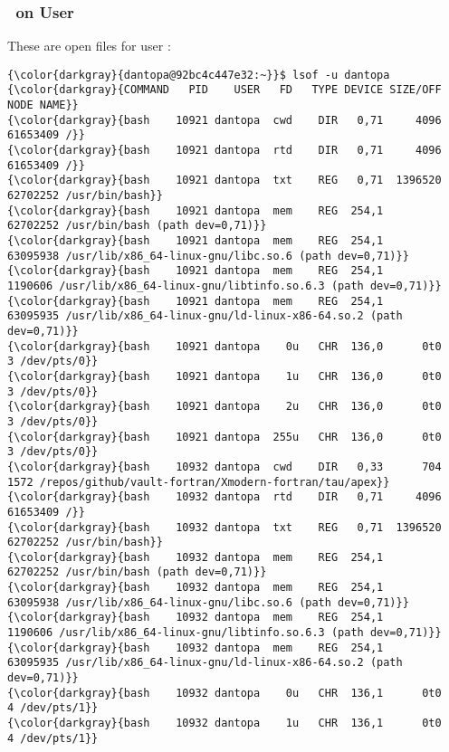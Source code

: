 {		\subsubsection{\lsof \ on User}
These are open files for user :
{\footnotesize{
\begin{Verbatim}[commandchars=\\\{\}]
{\color{darkgray}{dantopa@92bc4c447e32:~}}$ lsof -u dantopa
{\color{darkgray}{COMMAND   PID    USER   FD   TYPE DEVICE SIZE/OFF     NODE NAME}}
{\color{darkgray}{bash    10921 dantopa  cwd    DIR   0,71     4096 61653409 /}}
{\color{darkgray}{bash    10921 dantopa  rtd    DIR   0,71     4096 61653409 /}}
{\color{darkgray}{bash    10921 dantopa  txt    REG   0,71  1396520 62702252 /usr/bin/bash}}
{\color{darkgray}{bash    10921 dantopa  mem    REG  254,1          62702252 /usr/bin/bash (path dev=0,71)}}
{\color{darkgray}{bash    10921 dantopa  mem    REG  254,1          63095938 /usr/lib/x86_64-linux-gnu/libc.so.6 (path dev=0,71)}}
{\color{darkgray}{bash    10921 dantopa  mem    REG  254,1           1190606 /usr/lib/x86_64-linux-gnu/libtinfo.so.6.3 (path dev=0,71)}}
{\color{darkgray}{bash    10921 dantopa  mem    REG  254,1          63095935 /usr/lib/x86_64-linux-gnu/ld-linux-x86-64.so.2 (path dev=0,71)}}
{\color{darkgray}{bash    10921 dantopa    0u   CHR  136,0      0t0        3 /dev/pts/0}}
{\color{darkgray}{bash    10921 dantopa    1u   CHR  136,0      0t0        3 /dev/pts/0}}
{\color{darkgray}{bash    10921 dantopa    2u   CHR  136,0      0t0        3 /dev/pts/0}}
{\color{darkgray}{bash    10921 dantopa  255u   CHR  136,0      0t0        3 /dev/pts/0}}
{\color{darkgray}{bash    10932 dantopa  cwd    DIR   0,33      704     1572 /repos/github/vault-fortran/Xmodern-fortran/tau/apex}}
{\color{darkgray}{bash    10932 dantopa  rtd    DIR   0,71     4096 61653409 /}}
{\color{darkgray}{bash    10932 dantopa  txt    REG   0,71  1396520 62702252 /usr/bin/bash}}
{\color{darkgray}{bash    10932 dantopa  mem    REG  254,1          62702252 /usr/bin/bash (path dev=0,71)}}
{\color{darkgray}{bash    10932 dantopa  mem    REG  254,1          63095938 /usr/lib/x86_64-linux-gnu/libc.so.6 (path dev=0,71)}}
{\color{darkgray}{bash    10932 dantopa  mem    REG  254,1           1190606 /usr/lib/x86_64-linux-gnu/libtinfo.so.6.3 (path dev=0,71)}}
{\color{darkgray}{bash    10932 dantopa  mem    REG  254,1          63095935 /usr/lib/x86_64-linux-gnu/ld-linux-x86-64.so.2 (path dev=0,71)}}
{\color{darkgray}{bash    10932 dantopa    0u   CHR  136,1      0t0        4 /dev/pts/1}}
{\color{darkgray}{bash    10932 dantopa    1u   CHR  136,1      0t0        4 /dev/pts/1}}

\end{Verbatim}}}}
